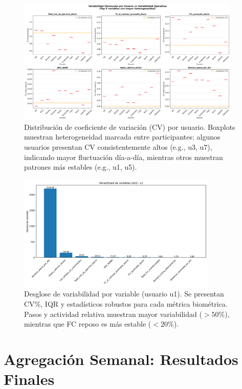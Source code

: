 \documentclass[12pt,letterpaper,twoside]{report}
\begin{document}
\begin{calculobox}
\begin{figure}[htbp]
\centering
\includegraphics[width=0.95\textwidth]{../analisis_u/variabilidad_dual/plots_consolidados/variabilidad_por_usuario_boxplot.png}
\caption{Distribución de coeficiente de variación (CV) por usuario. Boxplots muestran heterogeneidad marcada entre participantes: algunos usuarios presentan CV consistentemente altos (e.g., u3, u7), indicando mayor fluctuación día-a-día, mientras otros muestran patrones más estables (e.g., u1, u5).}
\label{fig:variabilidad_por_usuario}
\end{figure}

\begin{figure}[htbp]
\centering
\includegraphics[width=0.85\textwidth]{../analisis_u/variabilidad/variabilidad_variables_u1.png}
\caption{Desglose de variabilidad por variable (usuario u1). Se presentan CV\%, IQR y estadísticos robustos para cada métrica biométrica. Pasos y actividad relativa muestran mayor variabilidad ($>50\%$), mientras que FC reposo es más estable ($<20\%$).}
\label{fig:variabilidad_u1}
\end{figure}

\section{Agregación Semanal: Resultados Finales}


\end{calculobox}
\end{document}
